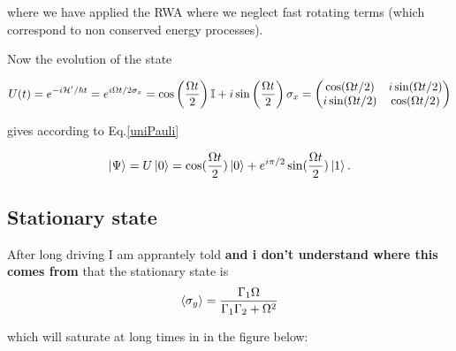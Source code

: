   \noindent  where we  have  applied the  RWA  where  we neglect  fast  rotating terms  (which
  correspond  to non  conserved energy  processes). 
  
      Now the evolution of the state
  
  \begin{equation}\label{app2Evv}
    U(t) = e^{-i\mathcal{H'}/\hbar t} = e^{i\Omega t/2\sigma_x} = \cos\left(\frac{\Omega t}{2}\right)\mathbb{I} + i\sin\left(\frac{\Omega t}{2}\right)\sigma_x = \begin{pmatrix}\cos(\Omega t/2)&i\sin(\Omega t/2)\\i\sin(\Omega t/2)&\cos(\Omega t/2)\end{pmatrix}
  \end{equation}
  
  \noindent gives according to Eq.\eqref{uniPauli}
  
  \begin{equation}\label{app2State}
    \ket{\Psi} = U\ket{0} = \cos(\frac{\Omega t}{2})\ket{0}+e^{i\pi/2}\sin(\frac{\Omega t}{2})\ket{1}.
  \end{equation}


 \subsection{Stationary state}
 After long  driving I am  apprantely told {\LARGE \textbf{and  i don't understand  where this
     comes from}} that the stationary state is
 \[
   {\left\langle \sigma_y \right\rangle}  = \frac{\Gamma_1 \Omega}{\Gamma_1\Gamma_2+\Omega^2}
 \]
   
 \noindent which will saturate at long times in in the figure below:
   
   
